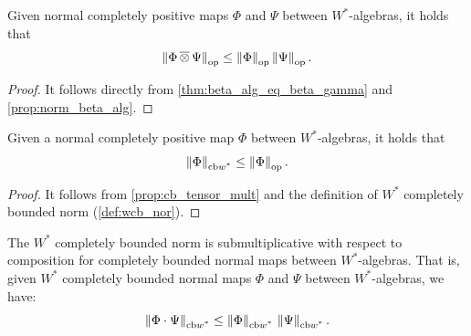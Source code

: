 \begin{proposition} \label{prop:cb_tensor_mult}
  Given normal completely positive maps  $\Phi$ and $\Psi$ between $W^*$-algebras, it holds that
  \[
  \left\lVert \Phi \,\overline{\otimes} \, \Psi \right\rVert_{\text{op}} \leq \left\lVert \Phi \right\rVert_{\text{op}} \left\lVert \Psi \right\rVert_{\text{op}}.
\]
\end{proposition}

\begin{proof}
It follows directly from \autoref{thm:beta_alg_eq_beta_gamma} and 
\autoref{prop:norm_beta_alg}.
\end{proof}

\begin{corollary} \label{cor:cbnorm_tensor_leq_norm}
   Given a normal completely positive map  $\Phi$ between $W^*$-algebras, it holds that
   \[
  \left\lVert \Phi \right\rVert_{\text{cb$w^*$}} \leq \left\lVert \Phi \right\rVert_{\text{op}}.
\]
\end{corollary}

\begin{proof}
  It follows from \autoref{prop:cb_tensor_mult} and the definition of $W^*$ completely bounded norm (\autoref{def:wcb_nor}). %
\end{proof}

\begin{proposition} \label{prop:w*cb_submult}
  The $W^*$ completely bounded norm is submultiplicative with respect to composition for completely bounded normal maps between $W^*$-algebras. That is, given $W^*$ completely bounded normal maps $\Phi$ and $\Psi$ between $W^*$-algebras, we have:
  \[
    \left\lVert \Phi \cdot \Psi \right\rVert_{\text{cb$w^*$}} \leq \left\lVert \Phi \right\rVert_{\text{cb$w^*$}} \, \left\lVert \Psi \right\rVert_{\text{cb$w^*$}}.
  \]
\end{proposition}

